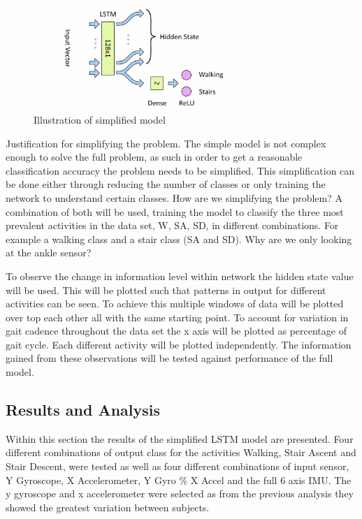 \documentclass[sensors,article,submit,moreauthors,pdftex]{Definitions/mdpi}
\begin{document}
\begin{figure}[!htb]
    \centering
    \includegraphics[width=0.8\textwidth]{Figures/lstm/Simplified_Network.jpg}
    \caption{Illustration of simplified model}
    \label{fig:simplfied_lstm_model}
\end{figure}

Justification for simplifying the problem. The simple model is not complex enough to solve the full problem, as such in order to get a reasonable classification accuracy the problem needs to be simplified. This simplification can be done either through reducing the number of classes or only training the network to understand certain classes. How are we simplifying the problem? A combination of both will be used, training the model to classify the three most prevalent activities in the data set, W, SA, SD, in different combinations. For example a walking class and a stair class (SA and SD). Why are we only looking at the ankle sensor?

To observe the change in information level within network the hidden state value will be used. This will be plotted such that patterns in output for different activities can be seen. To achieve this multiple windows of data will be plotted over top each other all with the same starting point. To account for variation in gait cadence throughout the data set the x axis will be plotted as percentage of gait cycle. Each different activity will be plotted independently. The information gained from these observations will be tested against performance of the full model.

\subsection{Results and Analysis}
Within this section the results of the simplified LSTM model are presented. Four different combinations of output class for the activities Walking, Stair Ascent and Stair Descent, were tested as well as four different combinations of input sensor, Y Gyroscope, X Accelerometer, Y Gyro \% X Accel and the full 6 axis IMU. The y gyroscope and x accelerometer were selected as from the previous analysis they showed the greatest variation between subjects.
\end{document}
